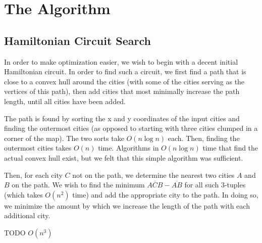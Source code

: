 \documentclass[letterpaper,11pt]{article}
\begin{document}

	\section{The Algorithm}
		\subsection{Hamiltonian Circuit Search}
			In order to make optimization easier, we wish to begin with
			a decent initial Hamiltonian circuit. In order to find such
			a circuit, we first find a path that is close to a convex hull
			around the cities (with some of the cities serving as the vertices
			of this path), then add cities that most minimally increase the
			path length, until all cities have been added.

			The path is found by sorting the x and y coordinates of the input
			cities and finding the outermost cities (as opposed to starting
			with three cities clumped in a corner of the map). The two sorts
			take $O(n \log n)$ each. Then, finding the outermost cities takes
			$O(n)$ time. Algorithms in $O(n \log n)$ time that find the actual
			convex hull exist, but we felt that this simple algorithm was
			sufficient.

			Then, for each city $C$ not on the path, we determine the nearest
			two cities $A$ and $B$ on the path. We wish to find the minimum
			$\overline{ACB} - \overline{AB}$ for all such 3-tuples (which takes
			$O(n^2)$ time) and add the appropriate city to the path. In doing
			so, we minimize the amount by which we increase the length of the
			path with each additional city.

			TODO $O(n^3)$
\end{document}
